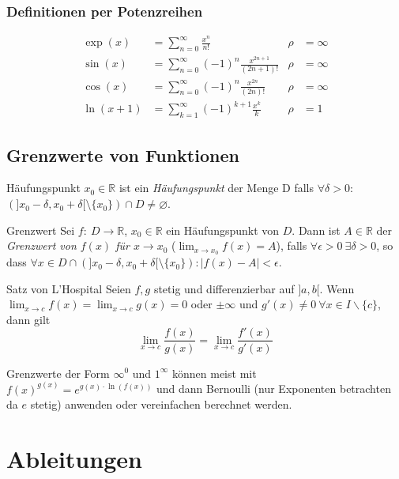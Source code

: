 \documentclass[a4paper,10pt]{article}
\def\sumk{\sum_{k=1}^\infty}
\def\sumn{\sum_{n=0}^\infty}
\def\R{\mathbb{R}}
\begin{document}
\subsubsection{Definitionen per Potenzreihen}
\begin{align*}
\exp(x) &= \sumn \frac{x^n}{n!} & \rho &= \infty \\
\sin(x) &= \sumn (-1)^n \frac{x^{2n + 1}}{(2n + 1)!} & \rho &= \infty \\
\cos(x) &= \sumn (-1)^n \frac{x^{2n}}{(2n)!} & \rho &= \infty \\
\ln(x + 1) &= \sumk (-1)^{k+1} \frac{x^k}{k} & \rho &= 1
\end{align*}

\subsection{Grenzwerte von Funktionen}
\begin{subbox}{Häufungspunkt}
 $x_0 \in \R$ ist ein \emph{Häufungspunkt} der Menge D falls $\forall \delta > 0$: $(]x_0 - \delta, x_0 + \delta[ \setminus \{x_0\}) \cap D \ne \varnothing$.
\end{subbox}

\begin{mainbox}{Grenzwert}
 Sei $f: \: D \to \R$, $x_0 \in \R$ ein Häufungspunkt von $D$. Dann ist $A \in \R$ der \emph{Grenzwert von $f(x)$ für $x \to x_0$} ($\lim_{x\to x_0} f(x) = A$), falls $\forall \epsilon > 0 \ \exists \delta > 0$, so dass $\forall x \in D \cap (]x_0 - \delta, x_0 + \delta[ \setminus \{x_0\}): |f(x) - A| < \epsilon$.
\end{mainbox}

\begin{subbox}{Satz von L'Hospital}
  Seien $f,g$ stetig und differenzierbar auf $]a,b[$. Wenn $\lim_{x\to c} f(x) = \lim_{x \to c} g(x) = 0$ oder $\pm \infty$ und $g'(x) \ne 0 \ \forall x \in I \backslash \{c\}$, dann gilt $$\lim_{x\to c} \frac{f(x)}{g(x)} = \lim_{x\to c}\frac{f'(x)}{g'(x)}$$
\end{subbox}

Grenzwerte der Form $\infty^0$ und $1^\infty$ können meist mit $f(x)^{g(x)} = e^{g(x)\cdot \ln(f(x))}$ und dann Bernoulli (nur Exponenten betrachten da $e$ stetig) anwenden oder vereinfachen berechnet werden.

\section{Ableitungen}
\end{document}

